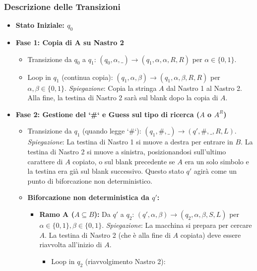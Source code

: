 \documentclass[a4paper]{article}
\begin{document}
\subsubsection{Descrizione delle Transizioni}
\begin{itemize}
    \item \textbf{Stato Iniziale: $q_0$}
    \item \textbf{Fase 1: Copia di A su Nastro 2}
        \begin{itemize}
            \item Transizione da $q_0$ a $q_1$:
                $(q_0, \alpha, \text{\_}) \to (q_1, \alpha, \alpha, R, R)$ per $\alpha \in \{0, 1\}$.
            \item Loop in $q_1$ (continua copia):
                $(q_1, \alpha, \beta) \to (q_1, \alpha, \beta, R, R)$ per $\alpha, \beta \in \{0, 1\}$.
                \textit{Spiegazione}: Copia la stringa $A$ dal Nastro 1 al Nastro 2. Alla fine, la testina di Nastro 2 sarà sul blank dopo la copia di $A$.
        \end{itemize}
    \item \textbf{Fase 2: Gestione del `#` e Guess sul tipo di ricerca ($A$ o $A^R$)}
        \begin{itemize}
            \item Transizione da $q_1$ (quando legge `#`):
                $(q_1, \#, \text{\_}) \to (q', \#, \text{\_}, R, L)$.
                \textit{Spiegazione}: La testina di Nastro 1 si muove a destra per entrare in $B$. La testina di Nastro 2 si muove a sinistra, posizionandosi sull'ultimo carattere di $A$ copiato, o sul blank precedente se $A$ era un solo simbolo e la testina era già sul blank successivo. Questo stato $q'$ agirà come un punto di biforcazione non deterministico.
            \item \textbf{Biforcazione non deterministica da $q'$:}
                \begin{itemize}
                    \item \textbf{Ramo A ($A \subseteq B$):} Da $q'$ a $q_2$:
                        $(q', \alpha, \beta) \to (q_2, \alpha, \beta, S, L)$ per $\alpha \in \{0, 1\}, \beta \in \{0, 1\}$.
                        \textit{Spiegazione}: La macchina si prepara per cercare $A$. La testina di Nastro 2 (che è alla fine di $A$ copiata) deve essere riavvolta all'inizio di $A$.
                        \begin{itemize}
                            \item Loop in $q_2$ (riavvolgimento Nastro 2):

\end{itemize}
\end{itemize}
\end{itemize}
\end{itemize}
\end{document}
